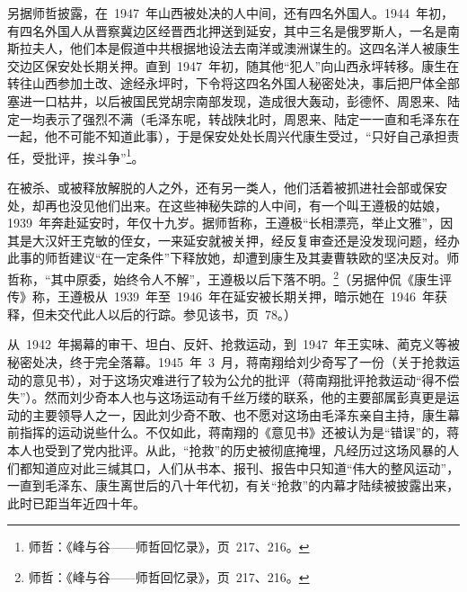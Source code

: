 另据师哲披露，在~1947~年山西被处决的人中间，还有四名外国人。1944~年初，有四名外国人从晋察冀边区经晋西北押送到延安，其中三名是俄罗斯人，一名是南斯拉夫人，他们本是假道中共根据地设法去南洋或澳洲谋生的。这四名洋人被康生交边区保安处长期关押。直到~1947~年初，随其他“犯人”向山西永坪转移。康生在转往山西参加土改、途经永坪时，下令将这四名外国人秘密处决，事后把尸体全部塞进一口枯井，以后被国民党胡宗南部发现，造成很大轰动，彭德怀、周恩来、陆定一均表示了强烈不满（毛泽东呢，转战陕北时，周恩来、陆定一一直和毛泽东在一起，他不可能不知道此事），于是保安处处长周兴代康生受过，“只好自己承担责任，受批评，挨斗争”\footnote{师哲：《峰与谷——师哲回忆录》，页~217、216。}。

在被杀、或被释放解脱的人之外，还有另一类人，他们活着被抓进社会部或保安处，却再也没见他们出来。在这些神秘失踪的人中间，有一个叫王遵极的姑娘，1939~年奔赴延安时，年仅十九岁。据师哲称，王遵极“长相漂亮，举止文雅”，因其是大汉奸王克敏的侄女，一来延安就被关押，经反复审查还是没发现问题，经办此事的师哲建议“在一定条件”下释放她，却遭到康生及其妻曹轶欧的坚决反对。师哲称，“其中原委，始终令人不解”，王遵极以后下落不明。\footnote{师哲：《峰与谷——师哲回忆录》，页~217、216。}（另据仲侃《康生评传》称，王遵极从~1939~年至~1946~年在延安被长期关押，暗示她在~1946~年获释，但未交代此人以后的行踪。参见该书，页~78。）

从~1942~年揭幕的审干、坦白、反奸、抢救运动，到~1947~年王实味、蔺克义等被秘密处决，终于完全落幕。1945~年~3~月，蒋南翔给刘少奇写了一份（关于抢救运动的意见书），对于这场灾难进行了较为公允的批评（蒋南翔批评抢救运动“得不偿失”）。然而刘少奇本人也与这场运动有千丝万缕的联系，他的主要部属彭真更是运动的主要领导人之一，因此刘少奇不敢、也不愿对这场由毛泽东亲自主持，康生幕前指挥的运动说些什么。不仅如此，蒋南翔的《意见书》还被认为是“错误”的，蒋本人也受到了党内批评。从此，“抢救”的历史被彻底掩埋，凡经历过这场风暴的人们都知道应对此三缄其口，人们从书本、报刊、报告中只知道“伟大的整风运动”，一直到毛泽东、康生离世后的八十年代初，有关“抢救”的内幕才陆续被披露出来，此时已距当年近四十年。